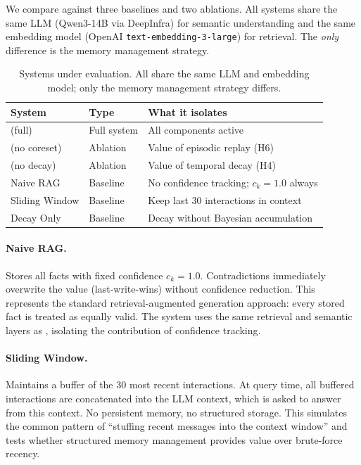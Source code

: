 We compare \membayes{} against three baselines and two ablations. All systems share the same LLM (Qwen3-14B via DeepInfra) for semantic understanding and the same embedding model (OpenAI \texttt{text-embedding-3-large}) for retrieval. The \emph{only} difference is the memory management strategy.

\begin{table}[t]
  \centering
  \caption{Systems under evaluation. All share the same LLM and embedding model; only the memory management strategy differs.}
  \label{tab:systems}
  \small
  \begin{tabular}{@{}l l l@{}}
    \toprule
    \textbf{System} & \textbf{Type} & \textbf{What it isolates} \\
    \midrule
    \rowcolor{nodeGray}
    \membayes{} (full)         & Full system     & All components active \\
    \membayes{} (no coreset)   & Ablation        & Value of episodic replay (H6) \\
    \rowcolor{nodeGray}
    \membayes{} (no decay)     & Ablation        & Value of temporal decay (H4) \\
    Naive RAG                  & Baseline        & No confidence tracking; $c_k = 1.0$ always \\
    \rowcolor{nodeGray}
    Sliding Window             & Baseline        & Keep last 30 interactions in context \\
    Decay Only                 & Baseline        & Decay without Bayesian accumulation \\
    \bottomrule
  \end{tabular}
\end{table}

\paragraph{Naive RAG.}
Stores all facts with fixed confidence $c_k = 1.0$. Contradictions immediately overwrite the value (last-write-wins) without confidence reduction. This represents the standard retrieval-augmented generation approach: every stored fact is treated as equally valid. The system uses the same retrieval and semantic layers as \membayes{}, isolating the contribution of confidence tracking.

\paragraph{Sliding Window.}
Maintains a buffer of the 30 most recent interactions. At query time, all buffered interactions are concatenated into the LLM context, which is asked to answer from this context. No persistent memory, no structured storage. This simulates the common pattern of ``stuffing recent messages into the context window'' and tests whether structured memory management provides value over brute-force recency.

